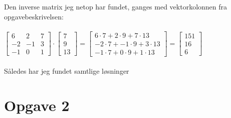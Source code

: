 \documentclass{article}
\begin{document}
Den inverse matrix jeg netop har fundet, ganges med vektorkolonnen fra opgavebeskrivelsen:
\\
\\
$\left[\begin{array}{ccc}6 & 2 & 7 \\ -2 & -1 & 3 \\ -1 & 0 & 1\end{array}\right] \cdot\left[\begin{array}{c}7 \\ 9 \\ 13\end{array}\right]=\left[\begin{array}{c}6 \cdot 7+2 \cdot 9+7 \cdot 13 \\ -2 \cdot 7+-1 \cdot 9+3 \cdot 13 \\ -1 \cdot 7+0 \cdot 9+1 \cdot 13\end{array}\right]=\left[\begin{array}{c}151 \\ 16 \\ 6\end{array}\right]$
\\
\\
Således har jeg fundet samtlige løsninger 


\section*{Opgave 2}
\end{document}
